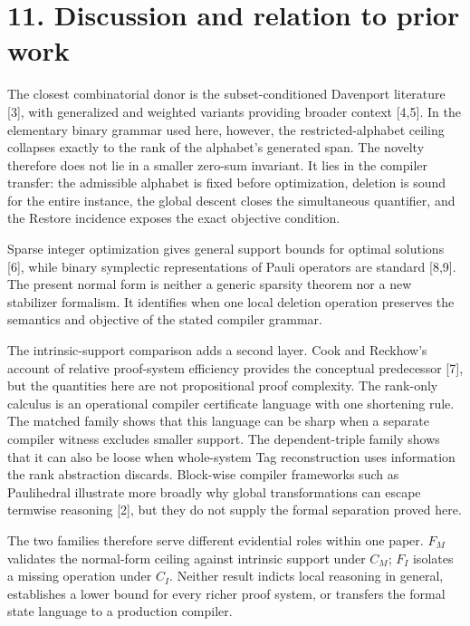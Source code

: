 \documentclass[11pt]{article}
\begin{document}
\section*{11. Discussion and relation to prior work}\label{discussion-and-relation-to-prior-work}

The closest combinatorial donor is the subset-conditioned Davenport literature {[}3{]}, with generalized and weighted variants providing broader context {[}4,5{]}. In the elementary binary grammar used here, however, the restricted-alphabet ceiling collapses exactly to the rank of the alphabet's generated span. The novelty therefore does not lie in a smaller zero-sum invariant. It lies in the compiler transfer: the admissible alphabet is fixed before optimization, deletion is sound for the entire instance, the global descent closes the simultaneous quantifier, and the Restore incidence exposes the exact objective condition.

Sparse integer optimization gives general support bounds for optimal solutions {[}6{]}, while binary symplectic representations of Pauli operators are standard {[}8,9{]}. The present normal form is neither a generic sparsity theorem nor a new stabilizer formalism. It identifies when one local deletion operation preserves the semantics and objective of the stated compiler grammar.

The intrinsic-support comparison adds a second layer. Cook and Reckhow's account of relative proof-system efficiency provides the conceptual predecessor {[}7{]}, but the quantities here are not propositional proof complexity. The rank-only calculus is an operational compiler certificate language with one shortening rule. The matched family shows that this language can be sharp when a separate compiler witness excludes smaller support. The dependent-triple family shows that it can also be loose when whole-system Tag reconstruction uses information the rank abstraction discards. Block-wise compiler frameworks such as Paulihedral illustrate more broadly why global transformations can escape termwise reasoning {[}2{]}, but they do not supply the formal separation proved here.

The two families therefore serve different evidential roles within one paper. \(F_M\) validates the normal-form ceiling against intrinsic support under \(C_M\); \(F_I\) isolates a missing operation under \(C_I\). Neither result indicts local reasoning in general, establishes a lower bound for every richer proof system, or transfers the formal state language to a production compiler.
\end{document}
